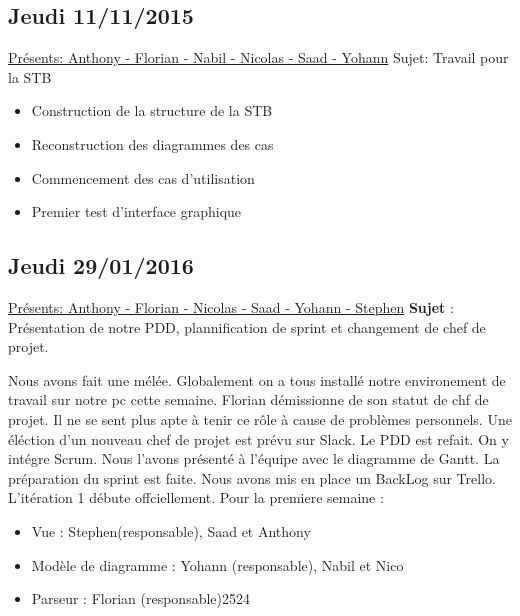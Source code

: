 \documentclass[a4paper,10pt]{article}
\begin{document}
\subsection{Jeudi 11/11/2015}
\underline{Présents: Anthony - Florian - Nabil - Nicolas - Saad - Yohann} \newline
Sujet: Travail pour la STB 
\begin{itemize}
 \item Construction de la structure de la STB
 \item Reconstruction des diagrammes des cas
 \item Commencement des cas d'utilisation
 \item Premier test d'interface graphique
\end{itemize}

\subsection{Jeudi 29/01/2016}
\underline{Présents: Anthony - Florian - Nicolas - Saad - Yohann - Stephen}  \newline
\textbf{Sujet} : Présentation de notre PDD, plannification de sprint et changement de chef de projet. 
\newline

Nous avons fait une mélée. Globalement on a tous installé notre environement de travail sur notre pc cette semaine.\newline
Florian démissionne de son statut de chf de projet. Il ne se sent plus apte à tenir ce rôle à cause de problèmes personnels.
Une éléction d'un nouveau chef de projet est prévu sur Slack.\newline
Le PDD est refait. On y intégre Scrum. Nous l'avons présenté à l'équipe avec le diagramme de Gantt.\newline
La préparation du sprint est faite. Nous avons mis en place un BackLog sur Trello.\newline
L'itération 1 débute offciellement.\newline
Pour la premiere semaine :
\begin{itemize}
 \item Vue : Stephen(responsable), Saad et Anthony
 \item Modèle de diagramme : Yohann (responsable), Nabil et Nico
 \item Parseur : Florian (responsable)2524
\end{itemize}
\end{document}
